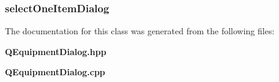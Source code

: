\subsubsection{ {\bf select\-One\-Item\-Dialog}\hspace{0.3cm}{\tt  [protected]}}\label{classQEquipmentDialog_p2}




The documentation for this class was generated from the following files:\begin{CompactItemize}
\item 
{\bf QEquipment\-Dialog.hpp}\item 
{\bf QEquipment\-Dialog.cpp}\end{CompactItemize}
